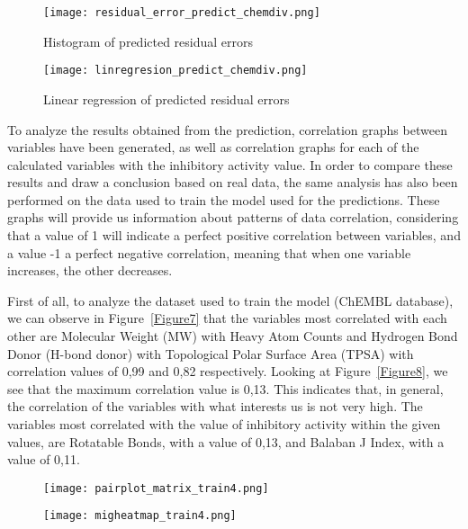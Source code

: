 \documentclass[final,times,twocolumn,article]{elsarticle}
\begin{document}
\begin{figure}[ht]
    \centering 
     \texttt{[image: residual\_error\_predict\_chemdiv.png]}	
     \caption{Histogram of predicted residual errors} 
     \label{Figure5}
 \end{figure}

 \begin{figure}[ht]
    \centering 
     \texttt{[image: linregresion\_predict\_chemdiv.png]}	
     \caption{Linear regression of predicted residual errors} 
     \label{Figure6}
 \end{figure}

 To analyze the results obtained from the prediction, correlation graphs between variables have been generated, as well as correlation graphs for each of the calculated variables with the inhibitory activity value. In order to compare these results and draw a conclusion based on real data, the same analysis has also been performed on the data used to train the model used for the predictions. These graphs will provide us information about patterns of data correlation, considering that a value of 1 will indicate a perfect positive correlation between variables, and a value -1 a perfect negative correlation, meaning that when one variable increases, the other decreases. 

 First of all, to analyze the dataset used to train the model (ChEMBL database), we can observe in Figure~\ref{Figure7} that the variables most correlated with each other are Molecular Weight (MW) with Heavy Atom Counts and Hydrogen Bond Donor (H-bond donor) with Topological Polar Surface Area (TPSA) with correlation values of 0,99 and 0,82 respectively. Looking at Figure~\ref{Figure8}, we see that the maximum correlation value is 0,13. This indicates that, in general, the correlation of the variables with what interests us is not very high. The variables most correlated with the value of inhibitory activity within the given values, are Rotatable Bonds, with a value of 0,13, and Balaban J Index, with a value of 0,11. 

\begin{figure*}
    \begin{subfigure}{0.6\textwidth}
        \texttt{[image: pairplot\_matrix\_train4.png]} 
        \caption{}%
    \end{subfigure}
    \hfill
    \begin{subfigure}{0.6\textwidth}
        \texttt{[image: migheatmap\_train4.png]}
        \caption{} %
    \end{subfigure}
    
    \caption{Correlation analysis from the dataset used to train the model (ChEMBL). (a) Pariplot correlation matrix. (b)Correlation matrix heatmap}
    \label{Figure7}
\end{figure*}
\end{document}
